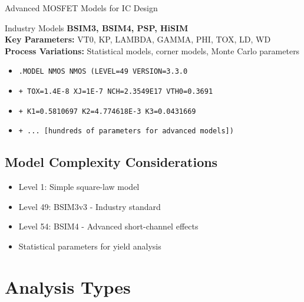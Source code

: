 \documentclass{beamer}
\begin{document}
\begin{frame}{Advanced MOSFET Models for IC Design}
    \begin{alertblock}{Industry Models}
        \textbf{BSIM3, BSIM4, PSP, HiSIM} \\
        \textbf{Key Parameters:} VT0, KP, LAMBDA, GAMMA, PHI, TOX, LD, WD \\
        \textbf{Process Variations:} Statistical models, corner models, Monte Carlo parameters
    \end{alertblock}
    
    \begin{itemize}
        \item \texttt{.MODEL NMOS NMOS (LEVEL=49 VERSION=3.3.0}
        \item \texttt{+ TOX=1.4E-8 XJ=1E-7 NCH=2.3549E17 VTH0=0.3691}
        \item \texttt{+ K1=0.5810697 K2=4.774618E-3 K3=0.0431669}
        \item \texttt{+ ... [hundreds of parameters for advanced models])}
    \end{itemize}
    
    \subsection{Model Complexity Considerations}
    \begin{itemize}
        \item Level 1: Simple square-law model
        \item Level 49: BSIM3v3 - Industry standard
        \item Level 54: BSIM4 - Advanced short-channel effects
        \item Statistical parameters for yield analysis
    \end{itemize}
\end{frame}

\section{Analysis Types}
\end{document}
